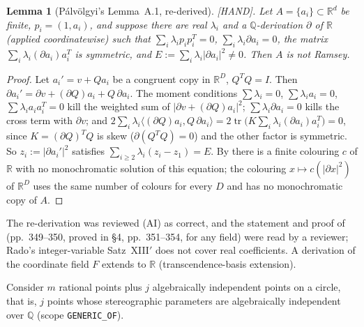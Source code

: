 \documentclass[11pt]{amsart}
\newcommand{\st}[1]{\textsf{[#1]}}
\newcommand{\Q}{\mathbb{Q}}
\newcommand{\R}{\mathbb{R}}
\theoremstyle{plain}
\newtheorem{lemma}[theorem]{Lemma}
\theoremstyle{definition}
\begin{document}
\begin{lemma}[P\'alv\"olgyi's Lemma~A.1, re-derived]\label{lem:A1}
\st{HAND}. Let $A=\{a_i\}\subset\R^d$ be finite, $p_i=(1,a_i)$, and suppose there are real $\lambda_i$ and a
$\Q$-derivation $\partial$ of $\R$ (applied coordinatewise) such that $\sum_i\lambda_ip_ip_i^T=0$,
$\sum_i\lambda_i\partial a_i=0$, the matrix $\sum_i\lambda_i(\partial a_i)a_i^T$ is symmetric, and
$E:=\sum_i\lambda_i|\partial a_i|^2\ne0$. Then $A$ is not Ramsey.
\end{lemma}

\begin{proof}
Let $a_i'=v+Qa_i$ be a congruent copy in $\R^D$, $Q^TQ=I$. Then
$\partial a_i'=\partial v+(\partial Q)a_i+Q\,\partial a_i$. The moment conditions $\sum\lambda_i=0$,
$\sum\lambda_ia_i=0$, $\sum\lambda_ia_ia_i^T=0$ kill the weighted sum of $|\partial v+(\partial Q)a_i|^2$;
$\sum\lambda_i\partial a_i=0$ kills the cross term with $\partial v$; and
$2\sum_i\lambda_i\langle(\partial Q)a_i,Q\,\partial a_i\rangle=2\operatorname{tr}\bigl(K\sum_i
\lambda_i(\partial a_i)a_i^T\bigr)=0$, since $K=(\partial Q)^TQ$ is skew ($\partial(Q^TQ)=0$) and the other
factor is symmetric. So $z_i:=|\partial a_i'|^2$ satisfies $\sum_{i\ge2}\lambda_i(z_i-z_1)=E$. By
\cite[Lemma~15]{EGMRSS} there is a finite colouring $c$ of $\R$ with no monochromatic solution of this
equation; the colouring $x\mapsto c(|\partial x|^2)$ of $\R^D$ uses the same number of colours for every $D$
and has no monochromatic copy of $A$.
\end{proof}

\noindent The re-derivation was reviewed (AI) as correct, and the statement and proof of
\cite[Lemma~15]{EGMRSS} (pp.~349--350, proved in \S4, pp.~351--354, for any field) were read by a
reviewer; Rado's integer-variable Satz~XIII$'$ does not cover real coefficients. A derivation of the
coordinate field $F$ extends to $\R$ (transcendence-basis extension).

Consider $m$ rational points plus $j$ algebraically independent points on a circle, that is, $j$
points whose stereographic parameters are algebraically independent over $\Q$ (scope
\texttt{GENERIC\_OF}).
\end{document}
